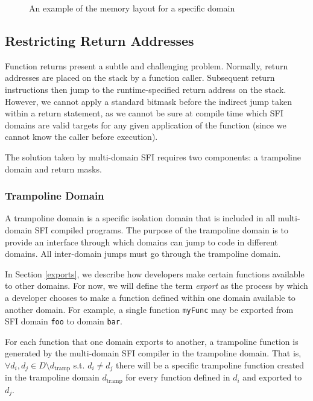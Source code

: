 \documentclass[12pt]{IEEEtran}
\begin{document}
\begin{figure*}[h]
\centering
\captionsetup{justification=centering}
\begin{drawstack}
	\startframe
		 
		 
\end{drawstack}
\caption{An example of the memory layout for a specific domain} \label{domain_layout}
\end{figure*}

\subsection{Restricting Return Addresses}

Function returns present a subtle and challenging problem. Normally, return addresses are placed on the stack by a function caller. Subsequent return instructions then jump to the runtime-specified return address on the stack. However, we cannot apply a standard bitmask before the indirect jump taken within a return statement, as we cannot be sure at compile time which SFI domains are valid targets for any given application of the function (since we cannot know the caller before execution).

The solution taken by multi-domain SFI requires two components: a trampoline domain and return masks. 

\subsubsection{Trampoline Domain} \label{trampoline}

A trampoline domain is a specific isolation domain that is included in all multi-domain SFI compiled programs. The purpose of the trampoline domain is to provide an interface through which domains can jump to code in different domains. All inter-domain jumps must go through the trampoline domain.

In Section \ref{exports}, we describe how developers make certain functions available to other domains. For now, we will define the term \textit{export} as the process by which a developer chooses to make a function defined within one domain available to another domain. For example, a single function \texttt{myFunc} may be exported from SFI domain \texttt{foo} to domain \texttt{bar}.

For each function that one domain exports to another, a trampoline function is generated by the multi-domain SFI compiler in the trampoline domain. That is, $\forall d_i, d_j \in D\setminus d_\text{tramp}$ s.t. $d_i\neq d_j$ there will be a specific trampoline function created in the trampoline domain $d_\text{tramp}$ for every function defined in $d_i$ and exported to $d_j$.
\end{document}
